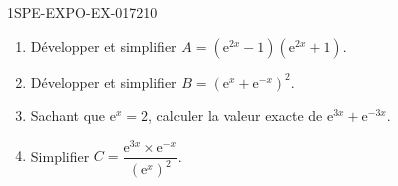 \begin{exercice}{1SPE-EXPO-EX-017}{2}{10}
\begin{enumerate}
  \item Développer et simplifier $A = \left(\mathrm{e}^{2x} - 1\right)\left(\mathrm{e}^{2x} + 1\right)$.
  \item Développer et simplifier $B = \left(\mathrm{e}^x + \mathrm{e}^{-x}\right)^2$.
  \item Sachant que $\mathrm{e}^x = 2$, calculer la valeur exacte de $\mathrm{e}^{3x} + \mathrm{e}^{-3x}$.
  \item Simplifier $C = \dfrac{\mathrm{e}^{3x} \times \mathrm{e}^{-x}}{\left(\mathrm{e}^x\right)^2}$.
\end{enumerate}
\end{exercice}
